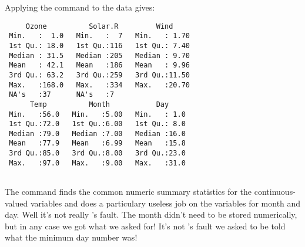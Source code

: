 Applying the  command to the  data gives: 
\begin{knitrout}
\color{fgcolor}\begin{kframe}
\begin{alltt}
\hlstd{> }
\end{alltt}
\begin{verbatim}
     Ozone          Solar.R         Wind      
 Min.   :  1.0   Min.   :  7   Min.   : 1.70  
 1st Qu.: 18.0   1st Qu.:116   1st Qu.: 7.40  
 Median : 31.5   Median :205   Median : 9.70  
 Mean   : 42.1   Mean   :186   Mean   : 9.96  
 3rd Qu.: 63.2   3rd Qu.:259   3rd Qu.:11.50  
 Max.   :168.0   Max.   :334   Max.   :20.70  
 NA's   :37      NA's   :7                    
      Temp          Month           Day      
 Min.   :56.0   Min.   :5.00   Min.   : 1.0  
 1st Qu.:72.0   1st Qu.:6.00   1st Qu.: 8.0  
 Median :79.0   Median :7.00   Median :16.0  
 Mean   :77.9   Mean   :6.99   Mean   :15.8  
 3rd Qu.:85.0   3rd Qu.:8.00   3rd Qu.:23.0  
 Max.   :97.0   Max.   :9.00   Max.   :31.0  
                                             
\end{verbatim}
\end{kframe}
\end{knitrout}
The  command finds the common numeric summary statistics for the continuous-valued variables and does a particulary useless job on the variables for month and day. Well it's not really \R{}'s fault. The month didn't need to be stored numerically, but in any case we got what we asked for! It's not \R{}'s fault we asked to be told what the minimum day number was! 
 
